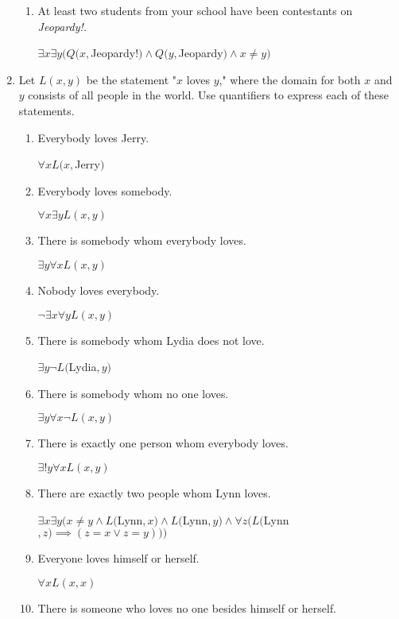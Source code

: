 \documentclass[11pt]{article}
\begin{document}
\begin{enumerate}[label=\textbf{\arabic*.}]
\begin{enumerate}[label=\textbf{\alph*)}]
		\item At least two students from your school have been contestants on \emph{Jeopardy!}.
		
		$\exists x\exists y(Q(x, $Jeopardy!$) \land Q(y, $Jeopardy$) \land x \ne y)$
	\end{enumerate}

	\item Let $L(x, y)$ be the statement "$x$ loves $y$," where the domain for both $x$ and $y$ consists of all people in the world. Use quantifiers to express each of these statements.
	\begin{enumerate}[label=\textbf{\alph*)}]
		\item Everybody loves Jerry.
		
		$\forall xL(x, $Jerry$)$
		
		\item Everybody loves somebody.
		
		$\forall x\exists yL(x, y)$
		
		\item There is somebody whom everybody loves.
		
		$\exists y\forall xL(x, y)$
		
		\item Nobody loves everybody.
		
		$\neg\exists x\forall yL(x, y)$
		
		\item There is somebody whom Lydia does not love.
		
		$\exists y\neg L($Lydia$,y)$
		
		\item There is somebody whom no one loves.
		
		$\exists y\forall x\neg L(x, y)$
		
		\item There is exactly one person whom everybody loves.
		
		$\exists! y\forall xL(x, y)$
		
		\item There are exactly two people whom Lynn loves.
		
		$\exists x\exists y(x \ne y \land L($Lynn$, x) \land L($Lynn$, y) \land \forall z(L($Lynn$, z) \implies (z = x \lor z = y)))$
		
		\item Everyone loves himself or herself.
		
		$\forall xL(x, x)$
		
		\item There is someone who loves no one besides himself or herself.
		

\end{enumerate}
\end{enumerate}
\end{document}

